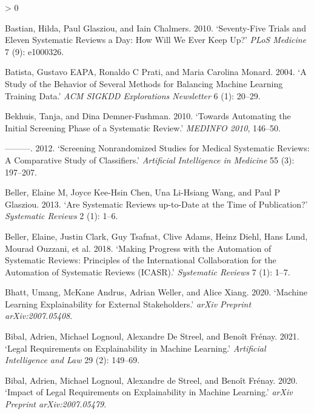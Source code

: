 \documentclass{article}
\newlength{\cslhangindent}
\newenvironment{CSLReferences}[2] %
 {%
  \setlength{\parindent}{0pt}
  \ifodd #1 \everypar{\setlength{\hangindent}{\cslhangindent}}\ignorespaces\fi
  \ifnum #2 > 0
  \setlength{\parskip}{#2\baselineskip}
  \fi
 }%
 {}
\begin{document}
\begin{CSLReferences}{1}{0}
\leavevmode\hypertarget{ref-bastian2010seventy}{}%
Bastian, Hilda, Paul Glasziou, and Iain Chalmers. 2010. {`Seventy-Five
Trials and Eleven Systematic Reviews a Day: How Will We Ever Keep Up?'}
\emph{PLoS Medicine} 7 (9): e1000326.

\leavevmode\hypertarget{ref-batista2004study}{}%
Batista, Gustavo EAPA, Ronaldo C Prati, and Maria Carolina Monard. 2004.
{`A Study of the Behavior of Several Methods for Balancing Machine
Learning Training Data.'} \emph{ACM SIGKDD Explorations Newsletter} 6
(1): 20--29.

\leavevmode\hypertarget{ref-bekhuis2010towards}{}%
Bekhuis, Tanja, and Dina Demner-Fushman. 2010. {`Towards Automating the
Initial Screening Phase of a Systematic Review.'} \emph{MEDINFO 2010},
146--50.

\leavevmode\hypertarget{ref-bekhuis2012screening}{}%
---------. 2012. {`Screening Nonrandomized Studies for Medical
Systematic Reviews: A Comparative Study of Classifiers.'}
\emph{Artificial Intelligence in Medicine} 55 (3): 197--207.

\leavevmode\hypertarget{ref-beller2013systematic}{}%
Beller, Elaine M, Joyce Kee-Hsin Chen, Una Li-Hsiang Wang, and Paul P
Glasziou. 2013. {`Are Systematic Reviews up-to-Date at the Time of
Publication?'} \emph{Systematic Reviews} 2 (1): 1--6.

\leavevmode\hypertarget{ref-beller2018making}{}%
Beller, Elaine, Justin Clark, Guy Tsafnat, Clive Adams, Heinz Diehl,
Hans Lund, Mourad Ouzzani, et al. 2018. {`Making Progress with the
Automation of Systematic Reviews: Principles of the International
Collaboration for the Automation of Systematic Reviews (ICASR).'}
\emph{Systematic Reviews} 7 (1): 1--7.

\leavevmode\hypertarget{ref-bhatt2020machine}{}%
Bhatt, Umang, McKane Andrus, Adrian Weller, and Alice Xiang. 2020.
{`Machine Learning Explainability for External Stakeholders.'}
\emph{arXiv Preprint arXiv:2007.05408}.

\leavevmode\hypertarget{ref-bibal2021legal}{}%
Bibal, Adrien, Michael Lognoul, Alexandre De Streel, and Benoît Frénay.
2021. {`Legal Requirements on Explainability in Machine Learning.'}
\emph{Artificial Intelligence and Law} 29 (2): 149--69.

\leavevmode\hypertarget{ref-bibal2020impact}{}%
Bibal, Adrien, Michael Lognoul, Alexandre de Streel, and Benoît Frénay.
2020. {`Impact of Legal Requirements on Explainability in Machine
Learning.'} \emph{arXiv Preprint arXiv:2007.05479}.


\end{CSLReferences}
\end{document}
